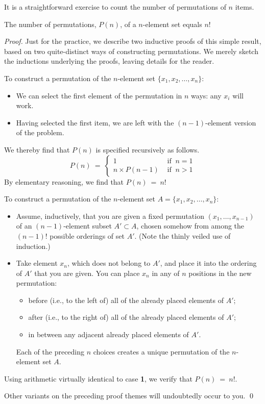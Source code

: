 It is a straightforward exercise to count the number of permutations of $n$ items.

\begin{prop}
\label{thm:no-permutation}
The number of permutations, $P(n)$, of a $n$-element set equals $n!$
\end{prop}

\begin{proof}
Just for the practice, we describe two inductive proofs of this simple result, based on two quite-distinct ways of constructing permutations.  We merely sketch the inductions underlying the proofs, leaving details for the reader.

\medskip

To construct a permutation of the $n$-element set $\{ x_1, x_2, \ldots , x_n\}$:
\begin{itemize}
\item
We can select the first element of the permutation in $n$ ways: any $x_i$ will work.
\item
Having selected the first item, we are left with the $(n-1)$-element version of the problem.
\end{itemize}
We thereby find that $P(n)$ is specified recursively as follows.
\[
P(n) \ = \ \left\{
\begin{array}{cl}
1 & \mbox{ if } \ n=1 \\
n \times P(n-1) & \mbox{ if } \ n>1
\end{array}
\right.
\]
By elementary reasoning, we find that $P(n) \ = \ n!$

\bigskip

To construct a permutation of the $n$-element set $A = \{ x_1, x_2, \ldots , x_n\}$:
\begin{itemize}
\item
Assume, inductively, that you are given a fixed  permutation $(x_1, \ldots , x_{n-1})$ of an $(n-1)$-element subset $A'  \subset A$, chosen somehow from among the $(n-1)!$ possible orderings of set $A'$.  (Note the thinly veiled use of induction.)
\item
Take element $x_n$, which does not belong to $A'$, and place it into the ordering of $A'$ that you are given.  You can place $x_n$ in any of $n$ positions in the new permutation:
  \begin{itemize}
  \item
before (i.e., to the left of) all of the already placed elements of $A'$;
  \item
after (i.e., to the right of) all of the already placed elements of $A'$;
  \item
in between any adjacent already placed elements of $A'$.
  \end{itemize}
Each of the preceding $n$ choices creates a unique permutation of the $n$-element set $A$.
\end{itemize}
Using arithmetic virtually identical to case {\bf 1}, we verify that $P(n) \ = \ n!$.

\medskip

\noindent
Other variants on the preceding proof themes will undoubtedly occur to you.   \qed
\end{proof}

